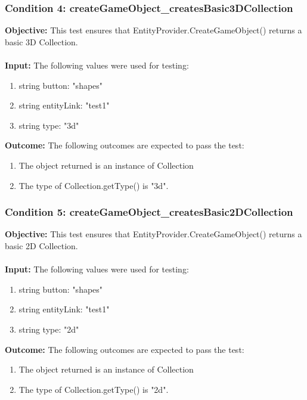 \documentclass[a4paper,12pt]{article}
\begin{document}
		\subsubsection{Condition 4: createGameObject\_createsBasic3DCollection}
			\textbf{Objective:} This test ensures that EntityProvider.CreateGameObject() returns a basic 3D Collection.\\\\
			\textbf{Input:} The following values were used for testing:
				\begin{enumerate}
					\item string button: "shapes"
					\item string entityLink: "test1"
					\item string type: "3d"
				\end{enumerate}
			\textbf{Outcome:} The following outcomes are expected to pass the test:
				\begin{enumerate}
					\item The object returned is an instance of Collection
					\item The type of Collection.getType() is "3d".
				\end{enumerate}
		\subsubsection{Condition 5: createGameObject\_createsBasic2DCollection}
			\textbf{Objective:} This test ensures that EntityProvider.CreateGameObject() returns a basic 2D Collection.\\\\
			\textbf{Input:} The following values were used for testing:
				\begin{enumerate}
					\item string button: "shapes"
					\item string entityLink: "test1"
					\item string type: "2d"
				\end{enumerate}
			\textbf{Outcome:} The following outcomes are expected to pass the test:
				\begin{enumerate}
					\item The object returned is an instance of Collection
					\item The type of Collection.getType() is "2d".
				\end{enumerate}
\end{document}
